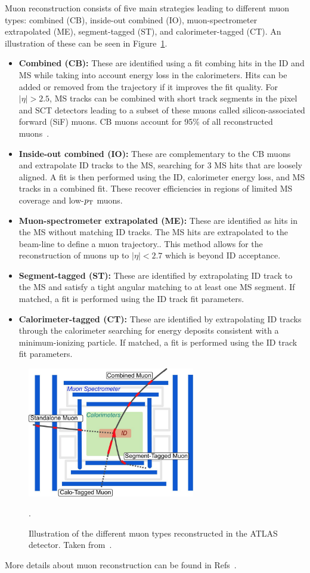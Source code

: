 Muon reconstruction consists of five main strategies leading to different muon types: combined (CB), inside-out combined (IO), muon-spectrometer extrapolated (ME), segment-tagged (ST), and calorimeter-tagged (CT). An illustration of these can be seen in Figure~\ref{fig:reco_muon_types}.
\begin{itemize}
  \item \textbf{Combined (CB):} These are identified using a fit combing hits in the ID and MS while taking into account energy loss in the calorimeters. Hits can be added or removed from the trajectory if it improves the fit quality. For $|\eta| > 2.5$, MS tracks can be combined with short track segments in the pixel and SCT detectors leading to a subset of these muons called silicon-associated forward (SiF) muons. CB muons account for 95\% of all reconstructed muons~\cite{ATLAS:2023iat}.
  \item \textbf{Inside-out combined (IO):} These are complementary to the CB muons and extrapolate ID tracks to the MS, searching for 3 MS hits that are loosely aligned. A fit is then performed using the ID, calorimeter energy loss, and MS tracks in a combined fit. These recover efficiencies in regions of limited MS coverage and low-$p_{\mathrm{T}}$ muons.
  \item \textbf{Muon-spectrometer extrapolated (ME):} These are identified as hits in the MS without matching ID tracks. The MS hits are extrapolated to the beam-line to define a muon trajectory.\@. This method allows for the reconstruction of muons up to $|\eta| < 2.7$ which is beyond ID acceptance.
  \item \textbf{Segment-tagged (ST):} These are identified by extrapolating ID track to the MS and satisfy a tight angular matching to at least one MS segment. If matched, a fit is performed using the ID track fit parameters.
  \item \textbf{Calorimeter-tagged (CT):} These are identified by extrapolating ID tracks through the calorimeter searching for energy deposits consistent with a minimum-ionizing particle\@. If matched, a fit is performed using the ID track fit parameters.
\end{itemize}

\begin{figure}[hpt]
  \centering
  \includegraphics[width=0.65\textwidth]{figures/reco/reco_muon_reconstructions.jpg}
  \caption{Illustration of the different muon types reconstructed in the ATLAS detector. Taken from~\cite{Rettie:2018lly}.}\label{fig:reco_muon_types}. 
\end{figure}

More details about muon reconstruction can be found in Refs~\cite{ATLAS:2020auj, Rettie:2018lly, ATLAS:2023iat}.
